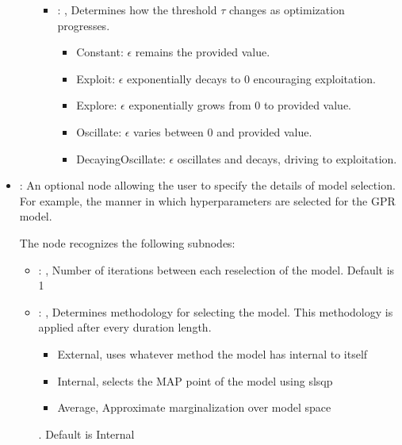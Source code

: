 \begin{itemize}
\begin{itemize}
\begin{itemize}
            \item {}: ,
              Determines how the threshold $\tau$ changes as optimization progresses.
              \begin{itemize}                                                  \item Constant:
              $\epsilon$ remains the provided value.
              \item Exploit: $\epsilon$ exponentially decays to 0 encouraging exploitation.
              \item Explore: $\epsilon$ exponentially grows from 0 to provided value.
              \item Oscillate: $\epsilon$ varies between 0 and provided value.
              \item DecayingOscillate: $\epsilon$ oscillates and decays, driving to exploitation.
              \end{itemize}
          \end{itemize}
      \end{itemize}

    \item {}:
      An optional node allowing the user to specify the details of model selection.
      For example, the manner in which hyperparameters are selected for the GPR model.

      The  node recognizes the following subnodes:
      \begin{itemize}
        \item {}: ,
          Number of iterations between each reselection of the model. Default is 1

        \item {}: ,
          Determines methodology for selecting the model. This methodology is applied
          after every duration length.
          \begin{itemize}                                                        \item External,
          uses whatever method the model has internal to itself
          \item Internal, selects the MAP point of the model using slsqp
          \item Average, Approximate marginalization over model space
          \end{itemize}. Default is Internal
      \end{itemize}


\end{itemize}
